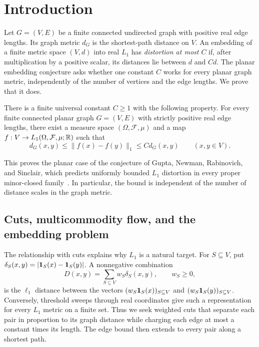 \section{Introduction}
\label{intro}

Let $G=(V,E)$ be a finite connected undirected graph with positive real
edge lengths. Its graph metric $d_G$ is the shortest-path distance on $V$.
An embedding of a finite metric space $(V,d)$ into real $L_1$ has
\emph{distortion at most $C$} if, after multiplication by a positive
scalar, its distances lie between $d$ and $Cd$.
The planar embedding conjecture asks whether one constant $C$ works for
every planar graph metric, independently of the number of vertices and
the edge lengths. We prove that it does.

\begin{theorem}\label{thm:main}
There is a finite universal constant $C\ge1$ with the following property.
For every finite connected planar graph $G=(V,E)$ with strictly positive real
edge lengths, there exist a measure space $(\Omega,\mathcal F,\mu)$ and a map
$f:V\to L_1(\Omega,\mathcal F,\mu;\mathbb R)$ such that
\[
 d_G(x,y)\le\|f(x)-f(y)\|_1\le C d_G(x,y)
 \qquad(x,y\in V).
\]
\end{theorem}

This proves the planar case of the conjecture of Gupta, Newman,
Rabinovich, and Sinclair, which predicts uniformly bounded $L_1$
distortion in every proper minor-closed family~\cite{GNRS04}.
In particular, the bound is independent of the number of distance
scales in the graph metric.

\subsection{Cuts, multicommodity flow, and the embedding problem}
\label{intro:flow}

The relationship with cuts explains why $L_1$ is a natural target.
For $S\subseteq V$, put
$\delta_S(x,y)=|\mathbf 1_S(x)-\mathbf 1_S(y)|$.
A nonnegative combination
\begin{equation}\label{intro:cut-metric}
 D(x,y)=\sum_{S\subseteq V}w_S\delta_S(x,y),\qquad w_S\ge0,
\end{equation}
is the $\ell_1$ distance between the vectors
$(w_S\mathbf 1_S(x))_{S\subseteq V}$ and $(w_S\mathbf 1_S(y))_{S\subseteq V}$.
Conversely, threshold sweeps through real coordinates give such a
representation for every $L_1$ metric on a finite set. Thus we seek
weighted cuts that separate each pair in proportion to its graph
distance while charging each edge at most a constant times its length.
The edge bound then extends to every pair along a shortest path.

